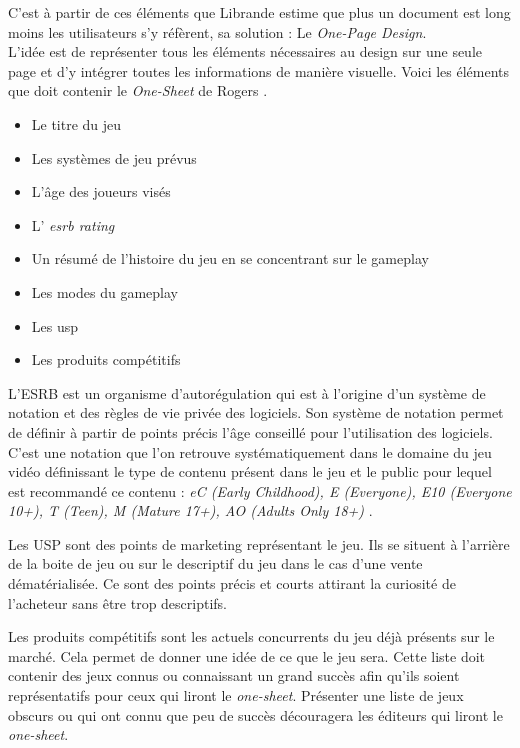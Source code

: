 C'est à partir de ces éléments que Librande \cite{onepage_librande} estime que plus un document est long moins les utilisateurs s'y réfèrent, sa solution : Le \emph{One-Page Design}.\\
L'idée est de représenter tous les éléments nécessaires au design sur une seule page et d'y intégrer toutes les informations de manière visuelle. 
Voici les éléments que doit contenir le \emph{One-Sheet} de Rogers \cite{LevelUpRogers2014}.
\begin{itemize}
    \item Le titre du jeu
    \item Les systèmes de jeu prévus
    \item L'âge des joueurs visés
\item L'\emph{ \gls{esrb} rating}
    \item Un résumé de l'histoire du jeu en se concentrant sur le gameplay
    \item Les modes du gameplay
    \item Les \gls{usp}
    \item Les produits compétitifs
\end{itemize}

L'ESRB est un organisme d'autorégulation qui est à l'origine d'un système de notation et des règles de vie privée des logiciels. Son système de notation permet de définir à partir de points précis l'âge conseillé pour l'utilisation des logiciels. C'est une notation que l'on retrouve systématiquement dans le domaine du jeu vidéo définissant le type de contenu présent dans le jeu et le public pour lequel est recommandé ce contenu : \emph{eC (Early Childhood), E (Everyone), E10 (Everyone 10+), T (Teen), M (Mature 17+), AO (Adults Only 18+)} .

Les USP sont des points de marketing représentant le jeu. Ils se situent à l'arrière de la boite de jeu ou sur le descriptif du jeu dans le cas d'une vente dématérialisée. Ce sont des points précis et courts attirant la curiosité de l'acheteur sans être trop descriptifs. 

Les produits compétitifs sont les actuels concurrents du jeu déjà présents sur le marché. Cela permet de donner une idée de ce que le jeu sera. Cette liste doit contenir des jeux connus ou connaissant un grand succès afin qu'ils soient représentatifs pour ceux qui liront le \emph{one-sheet}. Présenter une liste de jeux obscurs ou qui ont connu que peu de succès découragera les éditeurs qui liront le \emph{one-sheet}.

